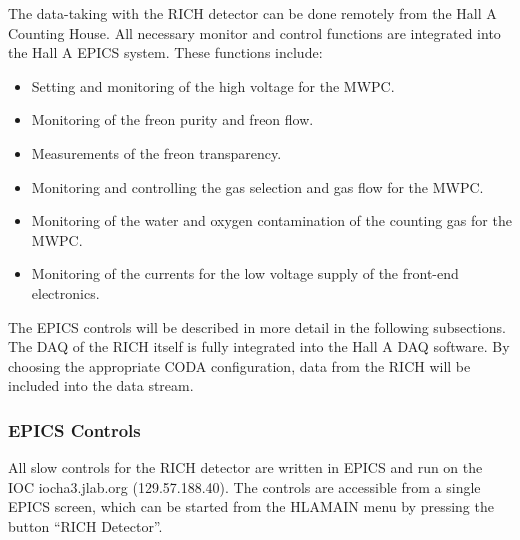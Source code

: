 {The data-taking with the RICH detector can be done remotely from the Hall A Counting House.
All necessary monitor and control functions are integrated into the Hall A EPICS system.
These functions include:
\begin{itemize}
\item Setting and monitoring of the high voltage for the MWPC.
\item Monitoring of the freon purity and freon flow.
\item Measurements of the freon transparency.
\item Monitoring and controlling the gas selection and gas flow for the MWPC.
\item Monitoring of the water and oxygen contamination of the counting gas for the MWPC.
\item Monitoring of the currents for the low voltage supply of the front-end electronics. 
\end{itemize}
The EPICS controls will be described in more detail in the following subsections.
The DAQ of the RICH itself is fully integrated into the Hall A DAQ software. By
choosing the appropriate CODA configuration, data from the RICH will be included into the
data stream. 

\subsubsection{EPICS Controls}

All slow controls for the RICH detector are written in EPICS
and run on the IOC iocha3.jlab.org (129.57.188.40). 
The controls are accessible from a single EPICS screen,
which can be started from the HLAMAIN menu \cite{EPICSwww} by pressing the 
button ``RICH Detector''.


}
